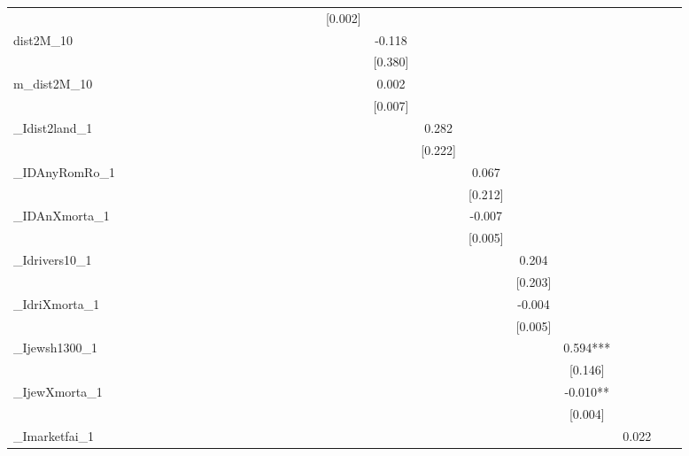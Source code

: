 \documentclass[landscape]{article}
\begin{document}
\begin{tabular}{lccccccccccccccccccccccccc}
 &  &  &  &  &  &  &  &  &  &  &  &  &  &  &  &  & [0.002] &  &  &  &  &  &  &  &  \\
dist2M\_10 &  &  &  &  &  &  &  &  &  &  &  &  &  &  &  &  &  & -0.118 &  &  &  &  &  &  &  \\
 &  &  &  &  &  &  &  &  &  &  &  &  &  &  &  &  &  & [0.380] &  &  &  &  &  &  &  \\
m\_dist2M\_10 &  &  &  &  &  &  &  &  &  &  &  &  &  &  &  &  &  & 0.002 &  &  &  &  &  &  &  \\
 &  &  &  &  &  &  &  &  &  &  &  &  &  &  &  &  &  & [0.007] &  &  &  &  &  &  &  \\
\_Idist2land\_1 &  &  &  &  &  &  &  &  &  &  &  &  &  &  &  &  &  &  & 0.282 &  &  &  &  &  &  \\
 &  &  &  &  &  &  &  &  &  &  &  &  &  &  &  &  &  &  & [0.222] &  &  &  &  &  &  \\
\_IDAnyRomRo\_1 &  &  &  &  &  &  &  &  &  &  &  &  &  &  &  &  &  &  &  & 0.067 &  &  &  &  &  \\
 &  &  &  &  &  &  &  &  &  &  &  &  &  &  &  &  &  &  &  & [0.212] &  &  &  &  &  \\
\_IDAnXmorta\_1 &  &  &  &  &  &  &  &  &  &  &  &  &  &  &  &  &  &  &  & -0.007 &  &  &  &  &  \\
 &  &  &  &  &  &  &  &  &  &  &  &  &  &  &  &  &  &  &  & [0.005] &  &  &  &  &  \\
\_Idrivers10\_1 &  &  &  &  &  &  &  &  &  &  &  &  &  &  &  &  &  &  &  &  & 0.204 &  &  &  &  \\
 &  &  &  &  &  &  &  &  &  &  &  &  &  &  &  &  &  &  &  &  & [0.203] &  &  &  &  \\
\_IdriXmorta\_1 &  &  &  &  &  &  &  &  &  &  &  &  &  &  &  &  &  &  &  &  & -0.004 &  &  &  &  \\
 &  &  &  &  &  &  &  &  &  &  &  &  &  &  &  &  &  &  &  &  & [0.005] &  &  &  &  \\
\_Ijewsh1300\_1 &  &  &  &  &  &  &  &  &  &  &  &  &  &  &  &  &  &  &  &  &  & 0.594*** &  &  &  \\
 &  &  &  &  &  &  &  &  &  &  &  &  &  &  &  &  &  &  &  &  &  & [0.146] &  &  &  \\
\_IjewXmorta\_1 &  &  &  &  &  &  &  &  &  &  &  &  &  &  &  &  &  &  &  &  &  & -0.010** &  &  &  \\
 &  &  &  &  &  &  &  &  &  &  &  &  &  &  &  &  &  &  &  &  &  & [0.004] &  &  &  \\
\_Imarketfai\_1 &  &  &  &  &  &  &  &  &  &  &  &  &  &  &  &  &  &  &  &  &  &  & 0.022 &  &  \\

\end{tabular}
\end{document}
